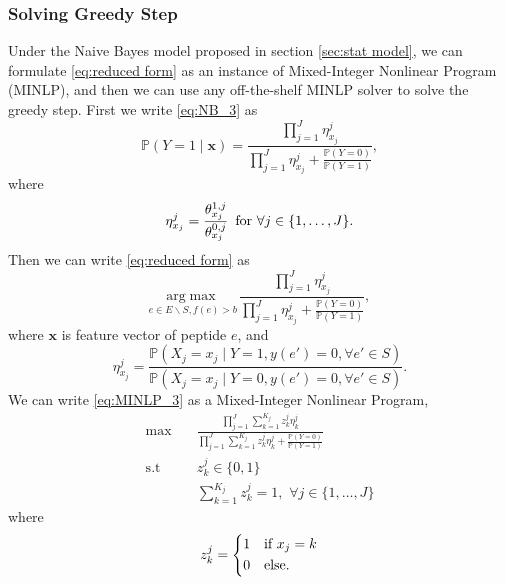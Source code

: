 \documentclass[11pt]{article}
\newcommand{\Prob}{\mathbb{P}}
\begin{document}
\subsubsection{Solving Greedy Step}
Under the Naive Bayes model proposed in section \ref{sec:stat model}, 
we can formulate \eqref{eq:reduced form} as an instance of Mixed-Integer 
Nonlinear Program (MINLP), and then we can use any off-the-shelf MINLP 
solver to solve the greedy step. First we write \eqref{eq:NB_3} as
\begin{equation}
  \Prob (Y = 1 \mid \bm{x}) = \frac{\prod_{j=1}^J \eta^j_{x_j}}
  {\prod_{j=1}^J \eta^j_{x_j} + \frac{\Prob(Y = 0)}{\Prob(Y = 1)}},
  \label{eq:MINLP_2}
\end{equation}
where
\begin{equation*}
  \eta^j_{x_j} = \frac{\theta^{1,j}_{x_j}}{\theta^{0,j}_{x_j}}
  \text{\,\,\,for $\forall j \in \{1,\ldots,J\}$}. 
\end{equation*}
Then we can write \eqref{eq:reduced form} as
\begin{equation}
  \underset{e \in E \backslash S, f(e) > b}{\mathrm{arg}\max} \, \frac{\prod_{j = 1}^J \eta^j_{x_j}}{\prod_{j = 1}^J \eta^j_{x_j} + \frac{\Prob(Y = 0)}{\Prob(Y = 1)}},
  \label{eq:MINLP_3}
\end{equation}
where $\bm{x}$ is feature vector of peptide $e$, and
\begin{equation*}
  \eta^j_{x_j} = \frac{\Prob(X_j = x_j \mid Y = 1, y(e') = 0, \forall e' \in S)}
  {\Prob(X_j = x_j \mid Y = 0, y(e') = 0, \forall e' \in S)}.
\end{equation*}
We can write \eqref{eq:MINLP_3} as a Mixed-Integer Nonlinear Program,
\begin{equation}
  \begin{split}
    \max \quad &\frac{\prod_{j=1}^J \sum_{k=1}^{K_j} z^j_k \eta^j_k}
    {\prod_{j=1}^J \sum_{k=1}^{K_j} z^j_k \eta^j_k + \frac{\Prob(Y = 0)}{\Prob(Y = 1)}} \\
    \text{s.t} \quad &z^j_k \in \{0,1\}\\
    &\sum_{k=1}^{K_j} z^j_k = 1, \,\, \forall j \in \{1, \ldots, J\}
  \end{split}
  \label{eq:MINLP_4}
\end{equation}
where
\begin{equation*}
z^j_k = \begin{dcases}
        1 & \text{if $x_j = k$}\\
        0 & \text{else}.
\end{dcases}
\end{equation*}
\end{document}
